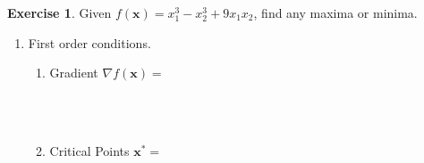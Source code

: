 \documentclass[
]{book}
\theoremstyle{definition}
\theoremstyle{definition}
\theoremstyle{definition}
\newtheorem{exercise}{Exercise}[chapter]
\theoremstyle{definition}
\theoremstyle{remark}
\begin{document}
\begin{exercise}
\protect\hypertarget{exr:unnamed-chunk-246}{}{\label{exr:unnamed-chunk-246} }Given \(f(\mathbf{x})=x_1^3-x_2^3+9x_1x_2\), find any maxima or minima.
\end{exercise}

\begin{enumerate}
  \item First order conditions.  
    \begin{enumerate}
    \item Gradient $\nabla f(\mathbf{x}) = $
        $$\phantom{\begin{pmatrix} \frac{\partial f}{\partial x_1} \\ 
        \frac{\partial f}{\partial x_2}\end{pmatrix} =
        \begin{pmatrix} 3x_1^2+9x_2 \\ -3x_2^2+9x_1 \end{pmatrix}}$$
    \item Critical Points $\mathbf{x^*} =$\\
        $$\phantom{3x_1^2 + 9x_2 = 0 \quad \Rightarrow \quad  9x_2 = 
        -3x_1^2 \quad \Rightarrow \quad  x_2 = -\frac{1}{3}x_1^2}$$
        $$\phantom{-3x_2^2 + 9x_1 = 0 \quad \Rightarrow \quad 
        -3(-\frac{1} {3}x_1^2)^2 + 9x_1 = 0}$$ 
        $$\phantom{\Rightarrow \quad -\frac{1}{3}x_1^4 
        + 9x_1 = 0 \quad \Rightarrow \quad x_1^3 = 27x_1 \quad 
        \Rightarrow \quad x_1 = 3}$$
        $$\phantom{3(3)^2 + 9x_2 = 0 \quad \Rightarrow \quad x_2 = -3}$$    
    \end{enumerate}       
 

\end{enumerate}
\end{document}
